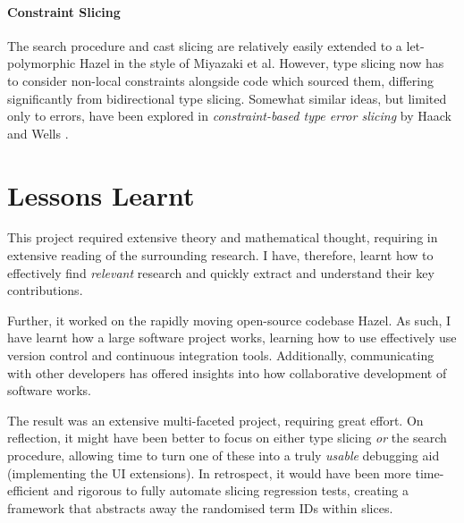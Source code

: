 \paragraph{Constraint Slicing}
The search procedure and cast slicing are relatively easily extended to a let-polymorphic Hazel in the style of Miyazaki et al. However, type slicing now has to consider non-local constraints alongside code which sourced them, differing significantly from bidirectional type slicing. Somewhat similar ideas, but limited only to errors, have been explored in \textit{constraint-based type error slicing} by Haack and Wells \cite{HaackErrSlice}.

\section{Lessons Learnt}
This project required extensive theory and mathematical thought, requiring in extensive reading of the surrounding research. I have, therefore, learnt how to effectively find \textit{relevant} research and quickly extract and understand their key contributions.

Further, it worked on the rapidly moving open-source codebase Hazel. As such, I have learnt how a large software project works, learning how to use effectively use version control and continuous integration tools. Additionally, communicating with other developers has offered insights into how collaborative development of software works.

The result was an extensive multi-faceted project, requiring great effort. On reflection, it might have been better to focus on either type slicing \textit{or} the search procedure, allowing time to turn one of these into a truly \textit{usable} debugging aid (implementing the UI extensions). In retrospect, it would have been more time-efficient and rigorous to fully automate slicing regression tests, creating a framework that abstracts away the randomised term IDs within slices.